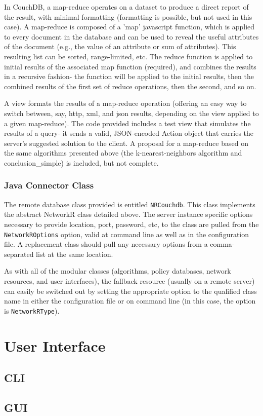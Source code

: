 In CouchDB, a map-reduce operates on a dataset to produce a direct report of the result, with minimal formatting (formatting is possible, but not used in this case). A  map-reduce is composed of a 'map' javascript function, which is applied to every document in the database and can be used to reveal the useful attributes of the document (e.g., the value of an attribute or sum of attributes). This resulting list can be sorted, range-limited, etc. The reduce function is applied to initial results of the associated map function (required), and combines the results in a recursive fashion- the function will be applied to the initial results, then the combined results of the first set of reduce operations, then the second, and so on. 

A view formats the results of a map-reduce operation (offering an easy way to switch between, say, http, xml, and json results, depending on the view applied to a given map-reduce).
The code provided includes a test view that simulates the results of a query- it sends a valid, JSON-encoded Action object that carries the server's suggested solution to the client. A proposal for a map-reduce based on the same algorithms presented above (the k-nearest-neighbors algorithm and conclusion\_simple) is included, but not complete.


\subsubsection{Java Connector Class}
The remote database class provided is entitled \texttt{NRCouchdb}. This class implements the abstract NetworkR class detailed above. The server instance specific options necessary to provide location, port, password, etc, to the class are pulled from the \texttt{NetworkROptions} option, valid at command line as well as in the configuration file. A replacement class should pull any necessary options from a comma-separated list at the same location.

As with all of the modular classes (algorithms, policy databases, network resources, and user interfaces), the fallback resource (usually on a remote server) can easily be switched out by setting the appropriate  option to the qualified class name in either the configuration file or on command line (in this case, the option is \texttt{NetworkRType}).

\section{User Interface} %


\subsection{CLI}%




\subsection{GUI}%

